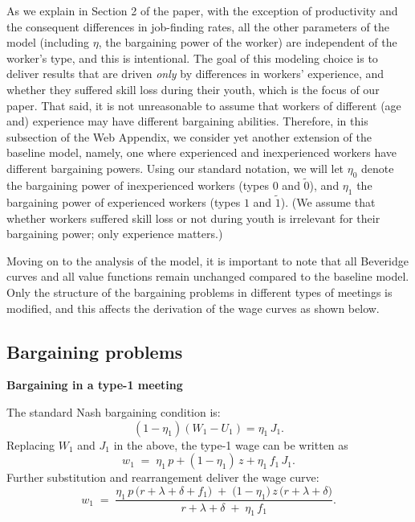 \documentclass[12pt]{article} %
\theoremstyle{definition}
\begin{document}
As we explain in Section 2 of the paper, with the exception of productivity and the consequent differences in job-finding rates, all the other parameters of the model (including $\eta$, the bargaining power of the worker) are independent of the worker's type, and this is intentional. The goal of this modeling choice is to deliver results that are driven \textit{only} by differences in workers' experience, and whether they suffered skill loss during their youth, which is the focus of our paper. That said, it is not unreasonable to assume that workers of different (age and) experience may have different bargaining abilities. Therefore, in this subsection of the Web Appendix, we consider yet another extension of the baseline model, namely, one where experienced and inexperienced workers have different bargaining powers. Using our standard notation, we will let $\eta_0$ denote the bargaining power of inexperienced workers (types \(0\) and \(\tilde{0}\)), and $\eta_1$ the bargaining power of experienced workers (types \(1\) and \(\tilde{1}\)). (We assume that whether workers suffered skill loss or not during youth is irrelevant for their bargaining power; only experience matters.)  


Moving on to the analysis of the model, it is important to note that all Beveridge curves and all value functions remain unchanged compared to the baseline model. Only the structure of the bargaining problems in different types of meetings is modified, and this affects the derivation of the wage curves as shown below.

\subsection*{Bargaining problems}\label{section bargaining}

\noindent \textbf{Bargaining in a type-1 meeting}

\medskip

\noindent The standard Nash bargaining condition is:
\begin{equation}
(1-\eta_1)(W_1 - U_1) = \eta_1 \, J_1. \nonumber 
\end{equation}
Replacing $W_1$ and $J_1$ in the above, the type-1 wage can be written as
\[
w_1 \;=\; \eta_1 \, p + (1-\eta_1)\,z + \eta_1 \, f_1 \, J_1.
\]
Further substitution and rearrangement deliver the wage curve:
\begin{equation}
w_1 \;=\; \frac{\eta_1 \, p \,\bigl(r+\lambda+\delta+f_1\bigr)\;+\;\bigl(1-\eta_1\bigr)\,z\,\bigl(r+\lambda+\delta\bigr)}{r+\lambda+\delta\;+\;\eta_1\, f_1}.
\label{eq WC 1 mod}
\end{equation}
\end{document}
